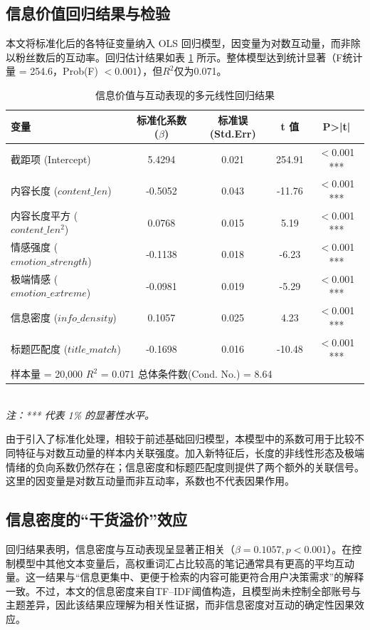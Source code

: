 \subsection{信息价值回归结果与检验}
本文将标准化后的各特征变量纳入 OLS 回归模型，因变量为对数互动量，而非除以粉丝数后的互动率。回归估计结果如表 \ref{tab:ols_results_info} 所示。整体模型达到统计显著（F统计量 = 254.6，Prob(F) $< 0.001$），但$R^2$仅为0.071。

\begin{table}[H]
    \centering
    \caption{信息价值与互动表现的多元线性回归结果}
    \label{tab:ols_results_info}
    \begin{tabular}{lcccc}
        \toprule
        \textbf{变量} & \textbf{标准化系数 ($\beta$)} & \textbf{标准误(Std.Err)} & \textbf{t 值} & \textbf{P>|t|} \\
        \midrule
        截距项 (Intercept)     & 5.4294  & 0.021 & 254.91 & $<$0.001 *** \\
        内容长度 ($content\_len$)      & -0.5052 & 0.043 & -11.76 & $<$0.001 *** \\
        内容长度平方 ($content\_len^2$)& 0.0768  & 0.015 & 5.19   & $<$0.001 *** \\
        情感强度 ($emotion\_strength$) & -0.1138 & 0.018 & -6.23  & $<$0.001 *** \\
        极端情感 ($emotion\_extreme$)   & -0.0981 & 0.019 & -5.29  & $<$0.001 *** \\
        信息密度 ($info\_density$)      & 0.1057  & 0.025 & 4.23   & $<$0.001 *** \\
        标题匹配度 ($title\_match$)     & -0.1698 & 0.016 & -10.48 & $<$0.001 *** \\
        \midrule
        \multicolumn{5}{l}{样本量 = 20,000 \quad $R^2$ = 0.071 \quad 总体条件数(Cond. No.) = 8.64} \\
        \bottomrule
    \end{tabular}
    \vspace{1ex}
    \\
    \small{\textit{注：*** 代表 1\% 的显著性水平。}}
\end{table}

由于引入了标准化处理，相较于前述基础回归模型，本模型中的系数可用于比较不同特征与对数互动量的样本内关联强度。加入新特征后，长度的非线性形态及极端情绪的负向系数仍然存在；信息密度和标题匹配度则提供了两个额外的关联信号。这里的因变量是对数互动量而非互动率，系数也不代表因果作用。

\subsection{信息密度的“干货溢价”效应}
回归结果表明，信息密度与互动表现呈显著正相关（$\beta=0.1057, p<0.001$）。在控制模型中其他文本变量后，高权重词汇占比较高的笔记通常具有更高的平均互动量。这一结果与“信息更集中、更便于检索的内容可能更符合用户决策需求”的解释一致。不过，本文的信息密度来自TF--IDF阈值构造，且模型尚未控制全部账号与主题差异，因此该结果应理解为相关性证据，而非信息密度对互动的确定性因果效应。

